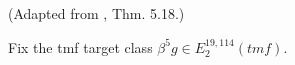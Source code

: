 \begin{definition}
\label{frontier:Literature:b9dce73bafd4}
(Adapted from \cite{BR21}, Thm. 5.18.)\par{}

Fix the tmf target class $\beta^5g\in E_2^{19,114}(\mathit{tmf})$.
\end{definition}

